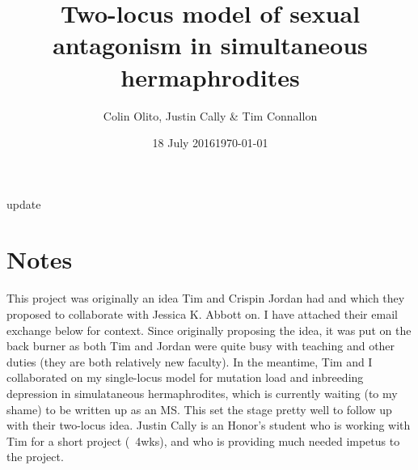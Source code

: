 \documentclass[11pt]{article}
\begin{document}
\title{Two-locus model of sexual antagonism in simultaneous hermaphrodites}
\author{Colin Olito, Justin Cally \& Tim Connallon}
\date{18 July 2016}
\maketitle

update \date{\today}

\section*{Notes}

This project was originally an idea Tim and Crispin Jordan had and which they proposed to collaborate with Jessica K. Abbott on. I have attached their email exchange below for context. Since originally proposing the idea, it was put on the back burner as both Tim and Jordan were quite busy with teaching and other duties (they are both relatively new faculty). In the meantime, Tim and I collaborated on my single-locus model for mutation load and inbreeding depression in simulataneous hermaphrodites, which is currently waiting (to my shame) to be written up as an MS. This set the stage pretty well to follow up with their two-locus idea. Justin Cally is an Honor's student who is working with Tim for a short project (~4wks), and who is providing much needed impetus to the project. \bigskip
\end{document}
